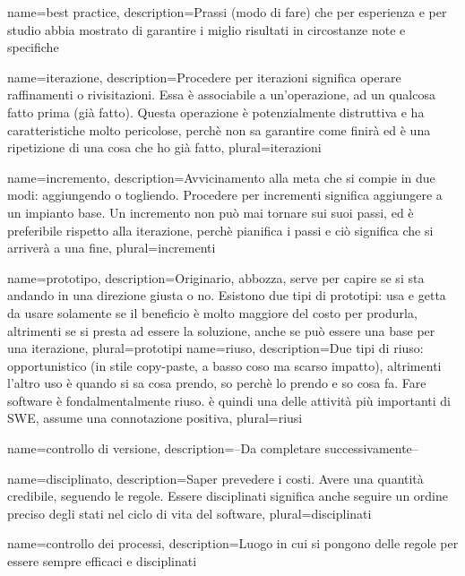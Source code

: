 {
name=best practice,
description={Prassi (modo di fare) che per esperienza e per studio abbia mostrato di garantire i miglio risultati in circostanze note e specifiche}
}

{
name=iterazione,
description={Procedere per iterazioni significa operare raffinamenti o rivisitazioni. Essa \`e associabile a un'operazione, ad un qualcosa fatto prima (gi\`a fatto). Questa operazione \`e potenzialmente distruttiva e ha caratteristiche molto pericolose, perch\`e non sa garantire come finir\`a ed \`e una ripetizione di una cosa che ho gi\`a fatto},
plural=iterazioni
}

{
name=incremento,
description={Avvicinamento alla meta che si compie in due modi: aggiungendo o togliendo. Procedere per incrementi significa aggiungere a un impianto base. Un incremento non pu\`o mai tornare sui suoi passi, ed \`e preferibile rispetto alla iterazione, perch\`e pianifica i passi e ci\`o significa che si arriver\`a a una fine},
plural=incrementi
}

{
name=prototipo,
description={Originario, abbozza, serve per capire se si sta andando in una direzione giusta o no. Esistono due tipi di prototipi: usa e getta da usare solamente se il beneficio \`e molto maggiore del costo per produrla, altrimenti se si presta ad essere la soluzione, anche se pu\`o essere una base per una iterazione},
plural=prototipi
}
{
name=riuso,
description={Due tipi di riuso: opportunistico (in stile copy-paste, a basso coso ma scarso impatto), altrimenti l'altro uso \`e quando si sa cosa prendo, so perch\`e lo prendo e so cosa fa. Fare software \`e fondalmentalmente riuso. \`e quindi una delle attivit\`a pi\`u importanti di SWE, assume una connotazione positiva},
plural=riusi
}

{
name=controllo di versione,
description={--Da completare successivamente--}
}

{
name=disciplinato,
description={Saper prevedere i costi. Avere una quantit\`a credibile, seguendo le regole. Essere disciplinati significa anche seguire un ordine preciso degli stati nel ciclo di vita del software},
plural=disciplinati
}

{
name=controllo dei processi,
description={Luogo in cui si pongono delle regole per essere sempre efficaci e disciplinati}
}

